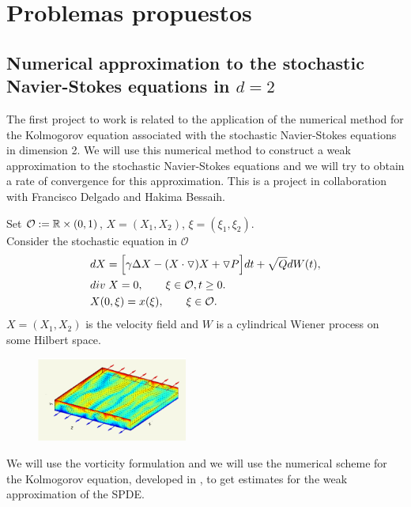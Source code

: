 \documentclass{article}
\numberwithin{equation}{section}
\begin{document}
\section{Problemas propuestos}
\subsection{Numerical approximation to the stochastic Navier-Stokes equations in $d=2$}
 The first project to work  is related to the application of the numerical method for the Kolmogorov equation associated with the 
stochastic Navier-Stokes equations in dimension 2. We will use this numerical method to construct a weak approximation to the 
stochastic Navier-Stokes equations and we will try to obtain a rate of convergence for this approximation.
This is a project in collaboration with Francisco Delgado and Hakima Bessaih. 


Set $\mathcal{O}:={\mathbb R}\times (0,1)$, $X=(X_1,X_2)$, $\xi=(\xi_1,\xi_2)$.\\
 Consider the stochastic equation in $\mathcal{O}$
 \begin{align*}
&d X=\Big[ \gamma \Delta X - (X\cdot \triangledown)X + \triangledown P\Big]dt+\sqrt{Q}dW(t),\\
&div\hspace*{0.1cm} X=0,\qquad \xi\in\mathcal{O}, t\ge 0.\nonumber\\
&X(0,\xi)=x(\xi), \qquad\xi\in \mathcal{O}.
\end{align*}
 $X=(X_1,X_2)$ is the velocity field and $W$ is a cylindrical Wiener process on some Hilbert space.
 
  
  \begin{figure}[H]
 \begin{center}
 
 \includegraphics[width = 1.95in]{u-box.jpeg} 
 \label{graph-simu_nu4.1}

 \end{center}
\end{figure}
We will use the vorticity formulation and we will use the numerical scheme for the Kolmogorov equation,
developed in \cite{de-fl}, to get estimates for the weak approximation of the SPDE. 
\end{document}

